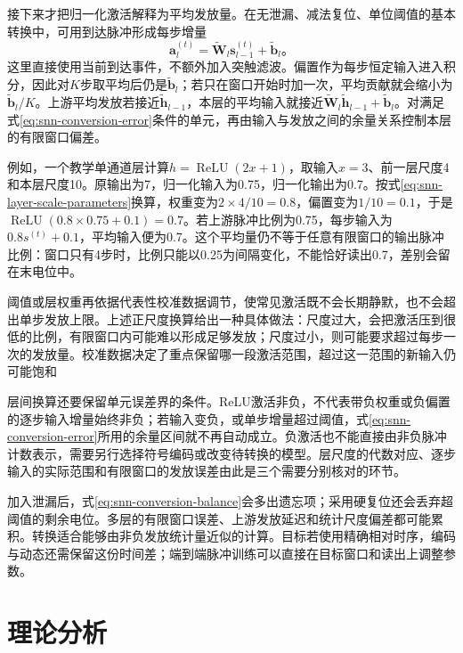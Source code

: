 接下来才把归一化激活解释为平均发放量。在无泄漏、减法复位、单位阈值的基本转换中，可用到达脉冲形成每步增量
\begin{equation}
  \bm a_l^{(t)}=\widetilde{\bm W}_l\bm s_{l-1}^{(t)}
                      +\widetilde{\bm b}_l\text{。}
  \label{eq:snn-converted-input}
\end{equation}
这里直接使用当前到达事件，不额外加入突触滤波。偏置作为每步恒定输入进入积分，因此对$K$步取平均后仍是$\widetilde{\bm b}_l$；若只在窗口开始时加一次，平均贡献就会缩小为$\widetilde{\bm b}_l/K$。上游平均发放若接近$\widetilde{\bm h}_{l-1}$，本层的平均输入就接近$\widetilde{\bm W}_l\widetilde{\bm h}_{l-1}+\widetilde{\bm b}_l$。对满足式\eqref{eq:snn-conversion-error}条件的单元，再由输入与发放之间的余量关系控制本层的有限窗口偏差。

例如，一个教学单通道层计算$h=\operatorname{ReLU}(2x+1)$，取输入$x=3$、前一层尺度4和本层尺度10。原输出为7，归一化输入为0.75，归一化输出为0.7。按式\eqref{eq:snn-layer-scale-parameters}换算，权重变为$2\times4/10=0.8$，偏置变为$1/10=0.1$，于是$\operatorname{ReLU}(0.8\times0.75+0.1)=0.7$。若上游脉冲比例为0.75，每步输入为$0.8s^{(t)}+0.1$，平均输入便为0.7。这个平均量仍不等于任意有限窗口的输出脉冲比例：窗口只有4步时，比例只能以0.25为间隔变化，不能恰好读出0.7，差别会留在末电位中。

阈值或层权重再依据代表性校准数据调节，使常见激活既不会长期静默，也不会超出单步发放上限。上述正尺度换算给出一种具体做法：尺度过大，会把激活压到很低的比例，有限窗口内可能难以形成足够发放；尺度过小，则可能要求超过每步一次的发放量。校准数据决定了重点保留哪一段激活范围，超过这一范围的新输入仍可能饱和

层间换算还要保留单元误差界的条件。ReLU激活非负，不代表带负权重或负偏置的逐步输入增量始终非负；若输入变负，或单步增量超过阈值，式\eqref{eq:snn-conversion-error}所用的余量区间就不再自动成立。负激活也不能直接由非负脉冲计数表示，需要另行选择符号编码或改变待转换的模型。层尺度的代数对应、逐步输入的实际范围和有限窗口的发放误差由此是三个需要分别核对的环节。

加入泄漏后，式\eqref{eq:snn-conversion-balance}会多出遗忘项；采用硬复位还会丢弃超阈值的剩余电位。多层的有限窗口误差、上游发放延迟和统计尺度偏差都可能累积。转换适合能够由非负发放统计量近似的计算。目标若使用精确相对时序，编码与动态还需保留这份时间差；端到端脉冲训练可以直接在目标窗口和读出上调整参数。

\section{理论分析}
\label{sec:snn-analysis}


